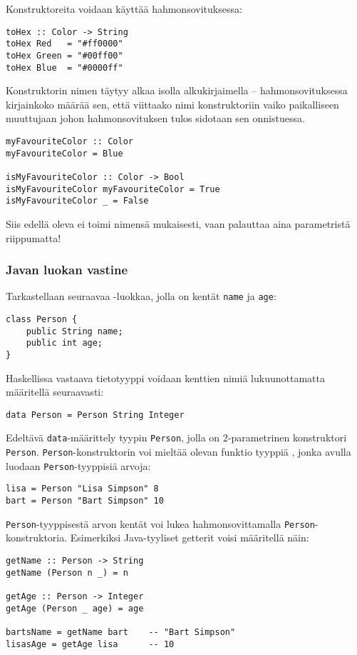 Konstruktoreita voidaan käyttää hahmonsovituksessa:
\begin{verbatim}
toHex :: Color -> String
toHex Red   = "#ff0000"
toHex Green = "#00ff00"
toHex Blue  = "#0000ff"
\end{verbatim}

Konstruktorin nimen täytyy alkaa isolla alkukirjaimella --
hahmonsovituksessa kirjainkoko määrää sen, että viittaako nimi konstruktoriin
vaiko paikalliseen muuttujaan johon hahmonsovituksen tulos sidotaan sen onnistuessa.

\begin{verbatim}
myFavouriteColor :: Color
myFavouriteColor = Blue

isMyFavouriteColor :: Color -> Bool
isMyFavouriteColor myFavouriteColor = True
isMyFavouriteColor _ = False
\end{verbatim}

Siis edellä oleva  ei toimi nimensä mukaisesti,
vaan palauttaa aina  parametristä riippumatta!

\subsubsection{Javan luokan vastine}
Tarkastellaan seuraavaa -luokkaa, jolla on kentät \texttt{name} ja \texttt{age}:
\begin{verbatim}
class Person {
    public String name;
    public int age;
}
\end{verbatim}
Haskellissa vastaava tietotyyppi voidaan kenttien nimiä lukuunottamatta määritellä seuraavasti:
\begin{verbatim}
data Person = Person String Integer
\end{verbatim}
Edeltävä \texttt{data}-määrittely tyypin \texttt{Person}, jolla on 2-parametrinen konstruktori \texttt{Person}.
\texttt{Person}-konstruktorin voi mieltää olevan funktio tyyppiä , jonka avulla luodaan \texttt{Person}-tyyppisiä arvoja:
\begin{verbatim}
lisa = Person "Lisa Simpson" 8
bart = Person "Bart Simpson" 10
\end{verbatim}
\texttt{Person}-tyyppisestä arvon kentät voi lukea hahmonsovittamalla \texttt{Person}-konstruktoria.
Esimerkiksi Java-tyyliset getterit voisi määritellä näin:
\begin{verbatim}
getName :: Person -> String
getName (Person n _) = n

getAge :: Person -> Integer
getAge (Person _ age) = age

bartsName = getName bart    -- "Bart Simpson"
lisasAge = getAge lisa      -- 10
\end{verbatim}

